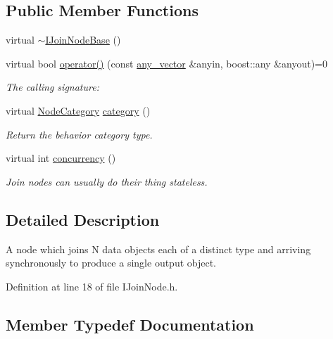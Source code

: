 \subsection*{Public Member Functions}
\begin{DoxyCompactItemize}
\item 
virtual \hyperlink{class_wire_cell_1_1_i_join_node_base_a3ce8adfd85d17ef7433cc615b934c488}{$\sim$\+I\+Join\+Node\+Base} ()
\item 
virtual bool \hyperlink{class_wire_cell_1_1_i_join_node_base_a8d90a969ef56dbb0731e70b05a9d06f8}{operator()} (const \hyperlink{class_wire_cell_1_1_i_join_node_base_a5d53e0f00c30b472677c399c7d358fa3}{any\+\_\+vector} \&anyin, boost\+::any \&anyout)=0
\begin{DoxyCompactList}\small\item\em The calling signature\+: \end{DoxyCompactList}\item 
virtual \hyperlink{class_wire_cell_1_1_i_node_a5546e64cbb70bd3ac787295cac9ac803}{Node\+Category} \hyperlink{class_wire_cell_1_1_i_join_node_base_aa136f23e80aa3919612a3fd396b502f9}{category} ()
\begin{DoxyCompactList}\small\item\em Return the behavior category type. \end{DoxyCompactList}\item 
virtual int \hyperlink{class_wire_cell_1_1_i_join_node_base_a03ae350e6d99bff19fc4e01c9e3d7f6d}{concurrency} ()
\begin{DoxyCompactList}\small\item\em Join nodes can usually do their thing stateless. \end{DoxyCompactList}\end{DoxyCompactItemize}


\subsection{Detailed Description}
A node which joins N data objects each of a distinct type and arriving synchronously to produce a single output object. 

Definition at line 18 of file I\+Join\+Node.\+h.



\subsection{Member Typedef Documentation}
\mbox{\label{class_wire_cell_1_1_i_join_node_base_a5d53e0f00c30b472677c399c7d358fa3}} 
